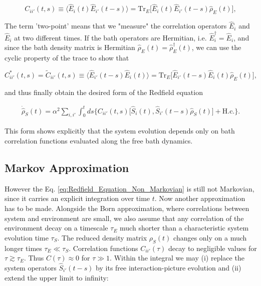 \begin{equation}
	C_{ii'}(t, s) \equiv \langle \hat{E}_{i}(t) \hat{E}_{i'}(t-s) \rangle = \mathrm{Tr}_E \big[\hat{E}_{i}(t) \hat{E}_{i'}(t-s) \hat{\rho}_E(t)\big],
	\label{eq:Environment_Correlation_Function}
\end{equation}

\noindent
The term 'two-point' means that we "measure" the correlation operators $\hat{E}_{i}$ and $\hat{E}_{i}$ at two different times.
If the bath operators are Hermitian, i.e. $\hat{E}_i^\dagger = \hat{E}_i$,
and since the bath density matrix is Hermitian $ \hat{\rho}_E(t) = \hat{\rho}_E^\dagger(t)$, we can use the cyclic property of the trace to show that

\begin{equation}
	C^{*}_{ii'}(t, s) = \tilde{C}_{ii'}(t, s) \equiv \langle \hat{E}_{i'}(t-s) \hat{E}_{i}(t) \rangle = \mathrm{Tr}_E \big[\hat{E}_{i'}(t-s) \hat{E}_{i}(t) \hat{\rho}_E(t)\big],
	\label{eq:Environment_Correlation_Function_Conjugate}
\end{equation}

\noindent
and thus finally obtain the desired form of the Redfield equation

\begin{align}
	\dot{\hat{\rho}}_S(t) = \alpha^2  \sum_{i, i'} \int_0^t ds
	\bigg\{
	C_{ii'}(t, s) \big[ \hat{S}_i(t),  \hat{S}_{i'}(t-s) \hat{\rho}_S(t) \big] + \text{H.c.}
	\bigg\}.
	\label{eq:Redfield_Equation_Non_Markovian}
\end{align}

\noindent
This form shows explicitly that the system evolution depends only on bath correlation functions evaluated along the free bath dynamics.


\subsection{Markov Approximation}
\label{subsec:markov_approximation}

\noindent
However the Eq. \eqref{eq:Redfield_Equation_Non_Markovian} is still not Markovian, since it carries an explicit integration over time $t$.
Now another approximation has to be made. Alongside the Born approximation, where correlations between system and environment are small, we also assume that any correlation of the environment decay on a timescale $\tau_E$ much shorter than a characteristic system evolution time $\tau_S$. The reduced density matrix $\rho_S(t)$ changes only on a much longer times $\tau_E \ll \tau_S$. Correlation functions $C_{ii'}(\tau)$ decay to negligible values for $\tau \gtrsim \tau_E$. Thus $ C(\tau) \approx 0$ for $\tau \gg 1$. Within the integral we may (i) replace the system operators $\hat{S}_{i'}(t-s)$ by its free interaction-picture evolution and (ii) extend the upper limit to infinity:


